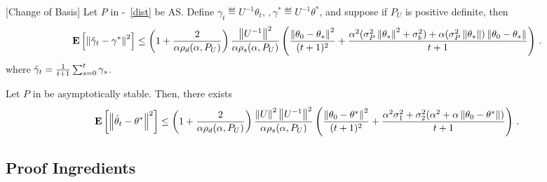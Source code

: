 \begin{theorem}\label{thm:simtran}[Change of Basis]
Let $P$ in -~\ref{dist} be AS. Define $\gamma_t\eqdef U^{-1}\theta_t,\,,\gamma^*\eqdef U^{-1}\theta^*$, and suppose if $P_U$ is positive definite, then
\begin{align}
\mathbf{E}\left[\left\| \hat{\gamma}_t-\gamma^*\right\|^2\right]
\leq
\left(1+\frac2{\alpha\rho_d(\alpha,P_U)}\right)\frac{\left\| U^{-1}\right\|^2}{\alpha \rho_s(\alpha,P_U)}
\left(\frac{\left\| \theta_0-\theta_*\right\|^2}{(t+1)^2}+ \frac{\alpha^2(\sigma_P^2\left\| \theta_*\right\|^2+\sigma_b^2)+\alpha (\sigma_P^2\left\| \theta_*\right\|)\left\| \theta_0-\theta_*\right\|}{t+1} \right)\,.
\end{align}
where $\hat{\gamma}_t=\frac{1}{t+1}\sum_{s=0}^t \gamma_s$.
\end{theorem}
\begin{corollary}\label{cor:as}
Let $P$ in  be asymptotically stable. Then, there exists
\begin{align}
\mathbf{E}\left[\left\| \hat{\theta}_t-\theta^*\right\|^2\right]
\leq
\left(1+\frac2{\alpha\rho_d(\alpha,P_U)}\right)\frac{\left\| U\right\|^2\left\| U^{-1}\right\|^2}{\alpha \rho_s(\alpha,P_U)} \left(\frac{\left\| \theta_0-\theta^*\right\|^2}{(t+1)^2}+ \frac{\alpha^2{\sigma}_1^2+ {\sigma}_2^2 (\alpha^2+\alpha \left\| \theta_0-\theta^*\right\|)}{t+1} \right)\,.
\end{align}
\end{corollary}
\subsection{Proof Ingredients}
